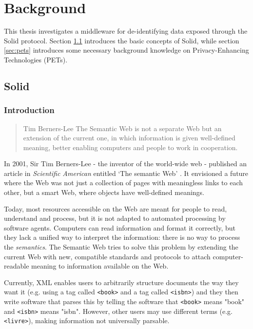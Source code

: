 \chapter{Background}
\label{cha:background}
This thesis investigates a middleware for de-identifying data exposed through the Solid protocol. Section \ref{sec:solid} introduces the basic concepts of Solid, while section \ref{sec:pets} introduces some necessary background knowledge on Privacy-Enhancing Technologies (PETs).

\section{Solid}
\label{sec:solid}

\subsection{Introduction}
\begin{quote}{Tim Berners-Lee}
    The Semantic Web is not a separate Web but an extension of the current one, in which information is given well-defined meaning, better enabling computers and people to work in cooperation.
\end{quote}

\noindent In 2001, Sir Tim Berners-Lee - the inventor of the world-wide web - published an article in \textit{Scientific American} entitled `The semantic Web' \citep{semantic-web}. It envisioned a future where the Web was not just a collection of pages with meaningless links to each other, but a smart Web, where objects have well-defined meanings.

Today, most resources accessible on the Web are meant for people to read, understand and process, but it is not adapted to automated processing by software agents. Computers can read information and format it correctly, but they lack a unified way to interpret the information: there is no way to process the \textit{semantics}. The Semantic Web tries to solve this problem by extending the current Web with new, compatible standards and protocols to attach computer-readable meaning to information available on the Web.

Currently, XML enables users to arbitrarily structure documents the way they want it (e.g. using a tag called \texttt{<book>} and a tag called \texttt{<isbn>}) and they then write software that parses this by telling the software that \texttt{<book>} means "book" and \texttt{<isbn>} means "isbn". However, other users may use different terms (e.g. \texttt{<livre>}), making information not universally parsable. 

